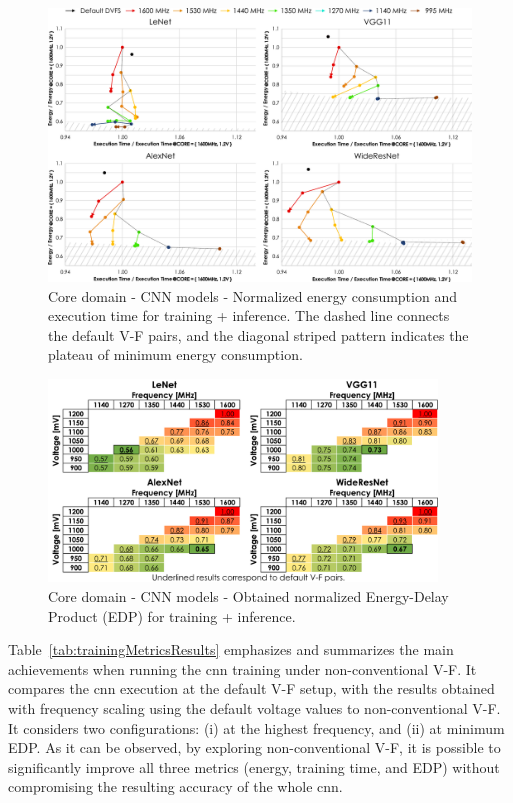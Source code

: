 \begin{figure}[!htb]
    \centering
        \includegraphics[width=\textwidth]{Figures/Application To Deep Learning/CNN_behaviour.pdf}
        \caption{Core domain - CNN models - Normalized energy consumption and execution time for training + inference. The dashed line connects the default V-F pairs, and the diagonal striped pattern indicates the plateau of minimum energy consumption.}
    \label{fig:CNN_Behaviour_training_inf}
\end{figure}

\begin{figure}[!htb]
    \centering
        \includegraphics[width=0.92\textwidth]{Figures/Application To Deep Learning/CNN_EDP.pdf}
        \caption{Core domain - CNN models - Obtained normalized Energy-Delay Product (EDP) for training + inference.}
    \label{fig:CNN_EDP_training_inf}
\end{figure}

Table~\ref{tab:trainingMetricsResults} emphasizes and summarizes the main achievements when running the \acrshort{cnn} training under non-conventional V-F. It compares the \acrshort{cnn} execution at the default V-F setup, with the results obtained with frequency scaling using the default voltage values to non-conventional V-F. It considers two configurations: (i) at the highest frequency, and (ii) at minimum EDP. As it can be observed, by exploring non-conventional V-F, it is possible to significantly improve all three metrics (energy, training time, and EDP) without compromising the resulting accuracy of the whole \acrshort{cnn}. 

